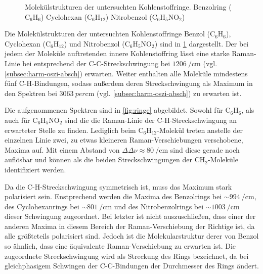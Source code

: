 \documentclass[../bericht.tex]{subfiles}
\begin{document}
      \begin{figure}[tb]
        \caption[Molekülstrukturen der untersuchten Kohlenstoffringe.]{Molekülstrukturen der untersuchten Kohlenstoffringe. \protect{} Benzolring ($\mathrm{C_6H_6}$) \protect{} Cyclohexan ($\mathrm{C_6H_{12}}$) \protect{} Nitrobenzol ($\mathrm{C_6H_5NO_2}$)}
        \label{fig:kohlenstoffringe-molekuele}
      \end{figure}

      Die Molekülstrukturen der untersuchten Kohlenstoffringe Benzol ($\mathrm{C_6H_6}$), Cyclohexan ($\mathrm{C_6H_{12}}$) und Nitrobenzol ($\mathrm{C_6H_5NO_2}$) sind in \cref{fig:kohlenstoffringe-molekuele} dargestellt. Der bei jedem der Moleküle auftretenden innere Kohlenstoffring lässt eine starke Raman-Linie bei entsprechend der C-C-Streckschwingung bei $\SI{1206}{\per\centi\meter}$ (vgl. \cref{subsec:harm-oszi-absch}) erwarten. Weiter enthalten alle Moleküle mindestens fünf C-H-Bindungen, sodass außerdem deren Streckschwingung als Maximum in den Spektren bei $\SI{3063}{per\centi\meter}$ (vgl. \cref{subsec:harm-oszi-absch}) zu erwarten ist.

      Die aufgenommenen Spektren sind in \cref{fig:ringe} abgebildet. Sowohl für $\mathrm{C_6H_6}$, als auch für $\mathrm{C_6H_5NO_2}$ sind die die Raman-Linie der C-H-Streckschwingung an erwarteter Stelle zu finden. Lediglich beim $\mathrm{C_6H_{12}}$-Molekül treten anstelle der einzelnen Linie zwei, zu etwas kleineren Raman-Verschiebungen verschobene, Maxima auf. Mit einem Abstand von $\Delta \Delta \nu \approx \SI{80}{\per\centi\meter}$ sind diese gerade noch auflösbar und können als die beiden Streckschwingungen der $\mathrm{CH_2}$-Moleküle identifiziert werden.

      Da die C-H-Streckschwingung symmetrisch ist, muss das Maximum stark polarisiert sein. Enstprechend werden die Maxima des Benzolrings bei $\sim\SI{994}{\per\centi\meter}$, des Cyclohexanrings bei $\sim\SI{801}{\per\centi\meter}$ und des Nitrobenzolrings bei $\sim\SI{1003}{\per\centi\meter}$ dieser Schwingung zugeordnet. Bei letzter ist nicht auszuschließen, dass einer der anderen Maxima in diesem Bereich der Raman-Verschiebung der Richtige ist, da alle größteteils polarisiert sind. Jedoch ist die Molekularstruktur derer von Benzol so ähnlich, dass eine äquivalente Raman-Verschiebung zu erwarten ist. Die zugeordnete Streckschwingung wird als Streckung des Rings bezeichnet, da bei gleichphasigem Schwingen der C-C-Bindungen der Durchmesser des Rings ändert.
\end{document}
